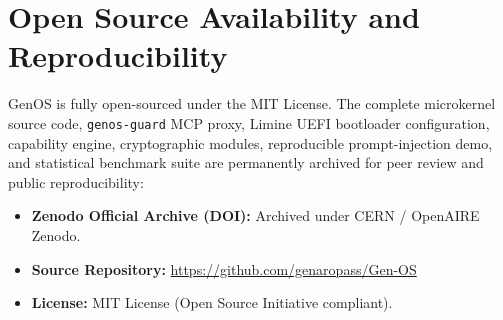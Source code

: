 \documentclass[10pt,journal,compsoc]{IEEEtran}
\theoremstyle{definition}
\begin{document}
\section*{Open Source Availability and Reproducibility}
GenOS is fully open-sourced under the MIT License. The complete microkernel source code, \texttt{genos-guard} MCP proxy, Limine UEFI bootloader configuration, capability engine, cryptographic modules, reproducible prompt-injection demo, and statistical benchmark suite are permanently archived for peer review and public reproducibility:
\begin{itemize}
    \item \textbf{Zenodo Official Archive (DOI):} Archived under CERN / OpenAIRE Zenodo.
    \item \textbf{Source Repository:} \url{https://github.com/genaropass/Gen-OS}
    \item \textbf{License:} MIT License (Open Source Initiative compliant).
\end{itemize}
\end{document}
